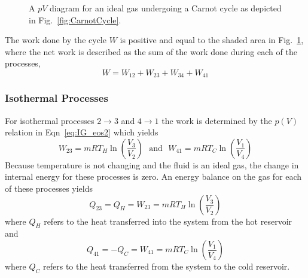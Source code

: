 \begin{figure}[h]
\begin{center}
\begin{tikzpicture}[auto,>=latex',
	declare function={
        		curveTH(\x) = 1/(\x);
		curveTC(\x) = 0.5/(\x);
		curveR(\x) = 0.8/(\x^(2));
		curveL(\x) = 0.4/(\x^(2));
  	}
	]
\end{tikzpicture}
\end{center}
\caption{A $pV$ diagram for an ideal gas undergoing a Carnot cycle as depicted in Fig.~\ref{fig:CarnotCycle}.}\label{fig:CarnotpVcycle}
\end{figure}

The work done by the cycle $W$ is positive and equal to the shaded area in Fig.~\ref{fig:CarnotpVcycle}, where the net work is described as the sum of the work done during each of the processes,
\begin{equation}
W= W_{12} + W_{23} + W_{34} + W_{41}
\end{equation}

\subsubsection{Isothermal Processes}
For isothermal processes $2 \to 3$ and $4 \to 1$ the work is determined by the $p(V)$ relation in Eqn~\eqref{eq:IG_eos2}
which yields
\begin{equation}
W_{23} =mRT_H\ln\left(\frac{V_3}{V_2}\right) \,\,\text{ and }\,\, W_{41} = mRT_C\ln\left(\frac{V_1}{V_4}\right)
\end{equation}
Because temperature is not changing and the fluid is an ideal gas, the change in internal energy for these processes is zero. An energy balance on the gas for each of these processes yields
\begin{equation}\label{eq:QH}
Q_{23} = Q_{H} = W_{23} = mRT_H\ln\left(\frac{V_3}{V_2}\right) 
\end{equation}
where $Q_H$ refers to the heat transferred into the system from the hot reservoir and 
\begin{equation}\label{eq:QC}
Q_{41} = - Q_{C} = W_{41} = mRT_C\ln\left(\frac{V_1}{V_4}\right)
\end{equation}
where $Q_C$ refers to the heat transferred from the system to the cold reservoir. 
